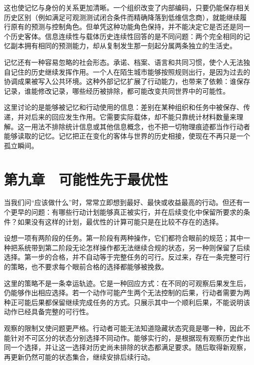 \documentclass[
  11pt,
  oneside]{book}
\begin{document}
这也使记忆与身份的关系更加清晰。一个组织改变了内部编码，只要仍能保存相关历史区别（例如满足可观测测试闭合条件而精确降落到低维信念商），就能继续履行原有的预测与控制角色。但单凭这种功能角色保持，并不能决定它是否还是同一个历史客体。信息连续性与载体历史连续性回答的是不同问题：两个完全相同的记忆副本拥有相同的预测能力，却从复制发生那一刻起分属两条独立的生活史。

记忆还有一种容易忽略的社会形态。承诺、档案、语言和共同习惯，使个人无法独自记住的历史继续发挥作用。一个人在陌生城市能够按照规则出行，是因为过去的协调成果被写入公共环境。这种外部记忆扩展了行动能力，也带来了依赖：谁保存记录，谁能修改记录，哪些经历被排除，都可能改变共同世界中的可能性。

\begingroup{}

这里讨论的是能够被记忆和行动使用的信息：差别在某种组织和任务中被保存、传递，并对后来的回应发生作用。它需要实际载体，却不能只靠统计材料数量来理解。这一用法不排除统计信息或其他信息概念，也不把一切物理痕迹都当作行动者能够读取的记忆。记忆把正在变化的客体与世界的历史相接，使现在不再只是一个孤立瞬间。

\par\endgroup

\chapter{第九章　可能性先于最优性}\label{ph-ch-09}

当我们问``应该做什么''时，常常立即想到最好、最快或收益最高的行动。但还有一个更早的问题：有哪些行动计划能够真正被实行，并在后续变化中保留所要求的条件？如果没有这样的计划，最优性的计算可能只是在比较不存在的选择。

设想一项有两阶段的任务。第一阶段有两种操作，它们都符合眼前的规范；其中一种把系统带到第二阶段无论怎样操作都无法继续合规的状态，另一种则保留了后续选择。第一步的合格，并不自动等于完整任务的可行。反过来，存在一条完整可行的策略，也不要求每个眼前合格的选择都能够被挽救。

这里的策略不是一条幸运轨迹。它是一种回应方式：在不同的可观察后果发生后，仍能够作出相应选择。若一个动作可能产生两个无法控制的后果，行动者需要为两种正可能后果都保留继续完成任务的方式。只展示其中一个顺利后果，不能说明该动作已经具备完整的可行性。

观察的限制又使问题更严格。行动者可能无法知道隐藏状态究竟是哪一种，因此不能针对不可区分的状态分别选择不同动作。能够实行的，是根据现有观察历史作出同一个选择，并让这一选择对历史尚未排除的状态都满足要求。随后取得新观察，再更新仍然可能的状态集合，继续安排后续行动。
\end{document}
